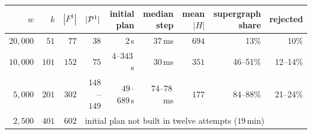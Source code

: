 \begin{tabular}{rrrrrrrrr}
\toprule
$w$ & $k$ & $|F^1|$ & $|\mathcal{P}^1|$ & initial plan & median step & mean $|H|$ & supergraph share & rejected \\
\midrule
$20{,}000$ & $51$ & $77$ & $38$ & $2$\,s & $37$\,ms & $694$ & 13\% & 10\% \\
$10{,}000$ & $101$ & $152$ & $75$ & $4$--$343$\,s & $30$\,ms & $351$ & 46--51\% & 12--14\% \\
$5{,}000$ & $201$ & $302$ & $148$--$149$ & $49$--$689$\,s & $74$--$78$\,ms & $177$ & 84--88\% & 21--24\% \\
$2{,}500$ & $401$ & $602$ & \multicolumn{6}{l}{initial plan not built in twelve attempts ($19$\,min)} \\
\bottomrule
\end{tabular}

